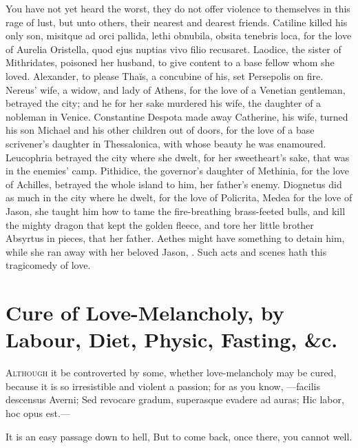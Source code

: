 {You have not yet heard the worst, they do not offer violence to
themselves in this rage of lust, but unto others, their nearest and
dearest friends. Catiline killed his only son, misitque ad orci
pallida, lethi obnubila, obsita tenebris loca, for the love of Aurelia
Oristella, quod ejus nuptias vivo filio recusaret. Laodice, the
sister of Mithridates, poisoned her husband, to give content to a base
fellow whom she loved. Alexander, to please Thaïs, a concubine of
his, set Persepolis on fire. Nereus' wife, a widow, and lady of
Athens, for the love of a Venetian gentleman, betrayed the city; and he
for her sake murdered his wife, the daughter of a nobleman in Venice.
Constantine Despota made away Catherine, his wife, turned his son
Michael and his other children out of doors, for the love of a base
scrivener's daughter in Thessalonica, with whose beauty he was
enamoured. Leucophria betrayed the city where she dwelt, for her
sweetheart's sake, that was in the enemies' camp. Pithidice, the
governor's daughter of Methinia, for the love of Achilles, betrayed the
whole island to him, her father's enemy. Diognetus did as much in
the city where he dwelt, for the love of Policrita, Medea for the love
of Jason, she taught him how to tame the fire-breathing brass-feeted
bulls, and kill the mighty dragon that kept the golden fleece, and tore
her little brother Absyrtus in pieces, that her father. Aethes might
have something to detain him, while she ran away with her beloved
Jason, \etc{}. Such acts and scenes hath this tragicomedy of love.


\section[Cure of Love-Melancholy]{Cure of Love-Melancholy, by Labour, Diet, Physic, Fasting, \&c.}

\lettrine{A}{lthough} it be controverted by some, whether love-melancholy may be
cured, because it is so irresistible and violent a passion; for as you
know,
---facilis descensus Averni;
Sed revocare gradum, superasque evadere ad auras;
Hic labor, hoc opus est.---

It is an easy passage down to hell,
But to come back, once there, you cannot well.

}
